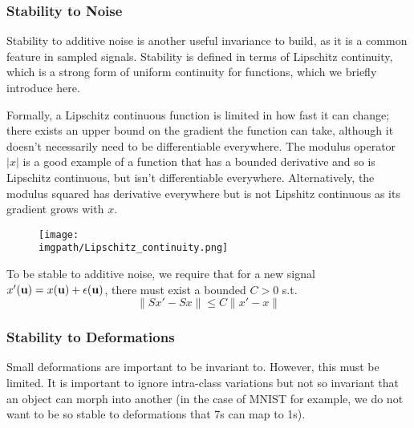 \subsubsection{Stability to Noise}
  Stability to additive noise is another useful invariance to build,
  as it is a common feature in sampled signals. Stability is defined in terms of
  Lipschitz continuity, which is a strong form of uniform continuity for
  functions, which we briefly introduce here.

  Formally, a Lipschitz continuous function is limited in how fast it can change;
  there exists an upper bound on the gradient the function can take, although it
  doesn't necessarily need to be differentiable everywhere. The modulus operator
  $|x|$ is a good example of a function that has a bounded derivative and so is
  Lipschitz continuous, but isn't differentiable everywhere. Alternatively, the
  modulus squared has derivative everywhere but is not Lipshitz continuous as
  its gradient grows with $x$.

  \begin{figure}
    \begin{center}
      \texttt{[image: \\imgpath/Lipschitz\_continuity.png]}
      \label{fig:lipschitz}
    \end{center}
  \end{figure}

  To be stable to additive noise, we require that for 
  a new signal $x'(\mathbf{u}) = x(\mathbf{u}) + \epsilon(\mathbf{u})$, there must exist
  a bounded $C>0$ s.t.
  \begin{equation}\label{eq:scat_noise_stability}
    \|S x' - S x\| \leq C \|x' - x\|
  \end{equation}

\subsubsection{Stability to Deformations}
  Small deformations are important to be invariant to. However, this must be
  limited. It is important to ignore intra-class variations 
  but not so invariant that an object can
  morph into another (in the case of MNIST for example, we do not want to be so
  stable to deformations that 7s can map to 1s). 
  
